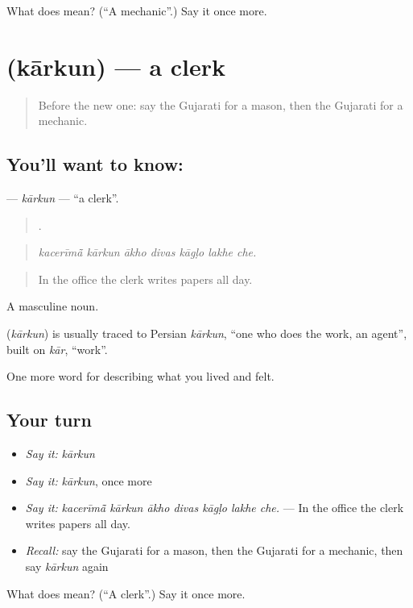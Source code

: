 \begin{tcolorbox}[breakable,colback=teal!4,colframe=teal!35!black,title={Before you move on}]
What does  mean? (\textquotedblleft{}A mechanic\textquotedblright{}.) Say it once more.
\end{tcolorbox}
\section[\texorpdfstring{\gu{કારકુન} (kārkun)}{કારકુન (kārkun)}]{ (kārkun) — a clerk}

\label{lesson:GU-C511-karkun}



\begin{quote}
Before the new one: say the Gujarati for a mason, then the Gujarati for a mechanic.
\end{quote}

\subsection*{You'll want to know: }
\textbf{} — \emph{kārkun} — \textquotedblleft{}a clerk\textquotedblright{}.

\begin{quote}
      .
\end{quote}

\begin{quote}
\emph{kacerīmā̃ kārkun ākho divas kāgḷo lakhe che.}
\end{quote}

\begin{quote}
In the office the clerk writes papers all day.
\end{quote}

A masculine noun.

\begin{cousinweb}
\textbf{} (\emph{kārkun}) is usually traced to Persian \emph{kārkun}, \textquotedblleft{}one who does the work, an agent\textquotedblright{}, built on \emph{kār}, \textquotedblleft{}work\textquotedblright{}.
\end{cousinweb}

\begin{grammarlens}[title={What you've built}]
One more word for describing what you lived and felt.
\end{grammarlens}

\subsection*{Your turn}
\begin{itemize}
\raggedright
  \item \emph{Say it:} \emph{kārkun}
  \item \emph{Say it:} \emph{kārkun}, once more
  \item \emph{Say it:} \emph{kacerīmā̃ kārkun ākho divas kāgḷo lakhe che.} — In the office the clerk writes papers all day.
  \item \emph{Recall:} say the Gujarati for a mason, then the Gujarati for a mechanic, then say \emph{kārkun} again
\end{itemize}

\begin{tcolorbox}[breakable,colback=teal!4,colframe=teal!35!black,title={Before you move on}]
What does  mean? (\textquotedblleft{}A clerk\textquotedblright{}.) Say it once more.
\end{tcolorbox}
